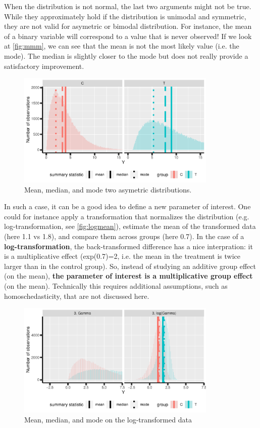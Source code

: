 \documentclass[12pt]{article}
\begin{document}
When the distribution is not normal, the last two arguments might not
be true. While they approximately hold if the distribution is unimodal
and symmetric, they are not valid for asymetric or bimodal
distribution. For instance, the mean of a binary variable will
correspond to a value that is never observed! If we look at
\autoref{fig:mmm}, we can see that the mean is not the most likely value
(i.e. the mode). The median is slightly closer to the mode but does
not really provide a satisfactory improvement.

\begin{figure}[!h]
\centering
\includegraphics[width=0.85\textwidth]{./figures/meanMedianMode.pdf}
\caption{\label{fig:mmm}Mean, median, and mode two asymetric distributions.}
\end{figure}

\clearpage

 In such a case, it can be a good idea to define a new parameter of
interest. One could for instance apply a transformation that
normalizes the distribution (e.g. log-transformation, see
\autoref{fig:logmean}), estimate the mean of the transformed data (here
1.1 vs 1.8), and compare them across groups (here 0.7). In the case of
a \textbf{log-transformation}, the back-transformed difference has a nice
interpration: it is a multiplicative effect (exp(0.7)=2, i.e. the mean
in the treatment is twice larger than in the control group). So,
instead of studying an additive group effect (on the mean), \textbf{the
parameter of interest is a multiplicative group effect} (on the
mean). Technically this requires additional assumptions, such as
homoschedasticity, that are not discussed here.


\begin{figure}[!h]
\centering
\includegraphics[width=0.85\textwidth]{./figures/logmean.pdf}
\caption{\label{fig:logmean}Mean, median, and mode on the log-transformed data}
\end{figure}
\end{document}
